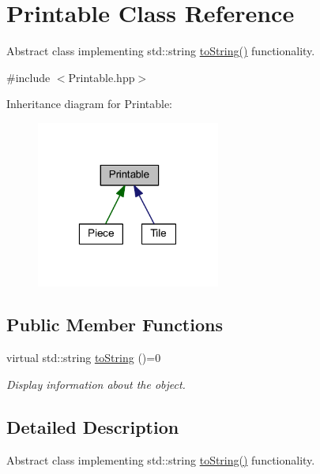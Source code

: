 \hypertarget{class_printable}{\section{Printable Class Reference}
\label{class_printable}
}


Abstract class implementing std\-::string \hyperlink{class_printable_a489f74384330f76d048d1ccf5c541571}{to\-String()} functionality.  




{\ttfamily \#include $<$Printable.\-hpp$>$}



Inheritance diagram for Printable\-:\nopagebreak
\begin{figure}[H]
\begin{center}
\leavevmode
\includegraphics[width=171pt]{class_printable__inherit__graph}
\end{center}
\end{figure}
\subsection*{Public Member Functions}
\begin{DoxyCompactItemize}
\item 
\hypertarget{class_printable_a489f74384330f76d048d1ccf5c541571}{virtual std\-::string \hyperlink{class_printable_a489f74384330f76d048d1ccf5c541571}{to\-String} ()=0}\label{class_printable_a489f74384330f76d048d1ccf5c541571}

\begin{DoxyCompactList}\small\item\em Display information about the object. \end{DoxyCompactList}\end{DoxyCompactItemize}


\subsection{Detailed Description}
Abstract class implementing std\-::string \hyperlink{class_printable_a489f74384330f76d048d1ccf5c541571}{to\-String()} functionality. 

